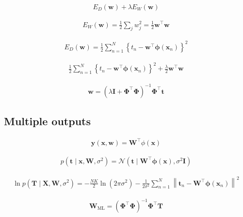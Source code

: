 \documentclass{article}
\begin{document}
\begin{align*}
E_D(\mathbf{w}) + \lambda E_W(\mathbf{w})
\tag{4.23}
\end{align*}

\begin{align*}
E_W(\mathbf{w}) = \frac{1}{2} \sum_{j} w_j^2 = \frac{1}{2} \mathbf{w}^{\top} \mathbf{w}
\tag{4.24}
\end{align*}

\begin{align*}
E_D(\mathbf{w}) = \frac{1}{2} \sum_{n=1}^{N} \left\{ t_n - \mathbf{w}^{\top} \boldsymbol{\phi}(\mathbf{x}_n) \right\}^2
\tag{4.25}
\end{align*}

\begin{align*}
\frac{1}{2} \sum_{n=1}^{N} \left\{ t_n - \mathbf{w}^{\top} \boldsymbol{\phi}(\mathbf{x}_n) \right\}^2 + \frac{\lambda}{2} \mathbf{w}^{\top} \mathbf{w}
\tag{4.26}
\end{align*}

\begin{align*}
\mathbf{w} = \left( \lambda \mathbf{I} + \boldsymbol{\Phi}^{\top} \boldsymbol{\Phi} \right)^{-1} \boldsymbol{\Phi}^{\top} \mathbf{t}
\tag{4.27}
\end{align*}

\subsection{Multiple outputs}

\begin{align*}
\mathbf{y}(\mathbf{x}, \mathbf{w}) = \mathbf{W}^{\top} \phi(\mathbf{x})
\tag{4.28}
\end{align*}

\begin{align*}
p(\mathbf{t} \mid \mathbf{x}, \mathbf{W}, \sigma^2) = \mathcal{N} \left( \mathbf{t} \mid \mathbf{W}^{\top} \boldsymbol{\phi}(\mathbf{x}), \sigma^2 \mathbf{I} \right)
\tag{4.29}
\end{align*}

\begin{align*}
\ln p(\mathbf{T} \mid \mathbf{X}, \mathbf{W}, \sigma^2) = -\frac{N K}{2} \ln \left( 2 \pi \sigma^2 \right) - \frac{1}{2 \sigma^2} \sum_{n=1}^{N} \left\| \mathbf{t}_n - \mathbf{W}^{\top} \boldsymbol{\phi}(\mathbf{x}_n) \right\|^2
\tag{4.30}
\end{align*}

\begin{align*}
\mathbf{W}_{\mathrm{ML}} = \left( \boldsymbol{\Phi}^{\top} \boldsymbol{\Phi} \right)^{-1} \boldsymbol{\Phi}^{\top} \mathbf{T}
\tag{4.31}
\end{align*}
\end{document}
